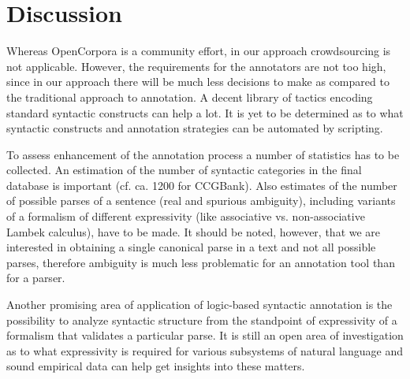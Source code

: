 \documentclass[a4paper]{article}
\theoremstyle{example-style}
\begin{document}
\section{Discussion}

Whereas OpenCorpora is a community effort, in our approach crowdsourcing is not applicable. However, the requirements for the annotators are not too high, since in our approach there will be much less decisions to make as compared to the traditional approach to annotation. A decent library of tactics encoding standard syntactic constructs can help a lot. It is yet to be determined as to what syntactic constructs and annotation strategies can be automated by scripting.

To assess enhancement of the annotation process a number of statistics has to be collected. An estimation of the number of syntactic categories in the final database is important (cf. ca. 1200 for CCGBank). Also estimates of the number of possible parses of a sentence (real and spurious ambiguity), including variants of a formalism of different expressivity (like associative vs. non-associative Lambek calculus), have to be made. It should be noted, however, that we are interested in obtaining a single canonical parse in a text and not all possible parses, therefore ambiguity is much less problematic for an annotation tool than for a parser.
  
Another promising area of application of logic-based syntactic annotation is the possibility to analyze syntactic structure from the standpoint of expressivity of a formalism that validates a particular parse. It is still an open area of investigation as to what expressivity is required for various subsystems of natural language and sound empirical data can help get insights into these matters.



\printbibliography[resetnumbers=true]
\end{document}
